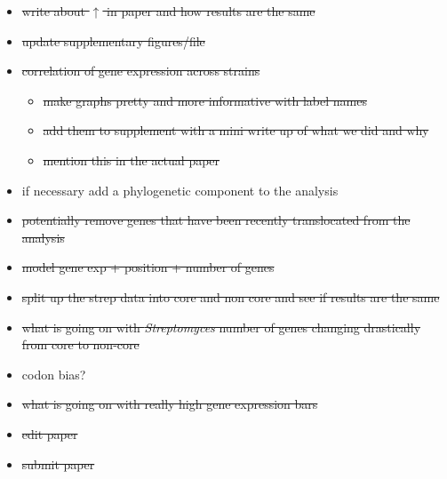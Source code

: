 \documentclass[12pt]{article}
\newcommand{\strep}{\textit{Streptomyces}\xspace}
\begin{document}
\begin{itemize}
	\item \sout{write about $\uparrow$ in paper and how results are the same}
	
	\item \sout{update supplementary figures/file}
	
	\item \sout{correlation of gene expression across strains}
	\begin{itemize}
		\item \sout{make graphs pretty and more informative with label names}
		\item \sout{add them to supplement with a mini write up of what we did and why}
		\item \sout{mention this in the actual paper}
	\end{itemize}
	
	\item if necessary add a phylogenetic component to the analysis
	
	\item \sout{potentially remove genes that have been recently translocated from the analysis}
	
	\item \sout{model gene exp + position + number of genes}
	
	\item \sout{split up the strep data into core and non core and see if results are the same}
	
	\item \sout{what is going on with \strep number of genes changing drastically from core to non-core}
	
	\item codon bias?
	
	\item \sout{what is going on with really high gene expression bars}
	
	\item \sout{edit paper}
	
	\item \sout{submit paper}
	
\end{itemize}
\end{document}

